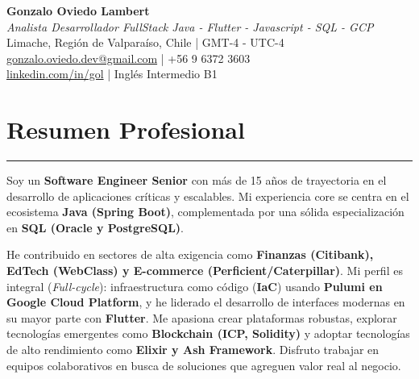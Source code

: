 \documentclass[11pt,a4paper]{article}
\begin{document}
\begin{center}
    {\LARGE \textbf{Gonzalo Oviedo Lambert}} \\
    \vspace{2pt}
    \textit{Analista Desarrollador FullStack Java - Flutter - Javascript - SQL - GCP} \\
    \vspace{2pt}
    Limache, Región de Valparaíso, Chile | GMT-4 - UTC-4 \\
    \vspace{2pt}
    \href{gonzalo.oviedo.dev@gmail.com}{gonzalo.oviedo.dev@gmail.com} | +56 9 6372 3603 \\
    \href{https://www.linkedin.com/in/gol}{linkedin.com/in/gol} | Inglés Intermedio B1
\end{center}


\section*{Resumen Profesional}
\hrule
\vspace{5pt}
\noindent
Soy un \textbf{Software Engineer Senior} con más de 15 años de trayectoria en el desarrollo de aplicaciones críticas y escalables. Mi experiencia core se centra en el ecosistema \textbf{Java (Spring Boot)}, complementada por una sólida especialización en \textbf{SQL (Oracle y PostgreSQL)}.

He contribuido en sectores de alta exigencia como \textbf{Finanzas (Citibank), EdTech (WebClass) y E-commerce (Perficient/Caterpillar)}. Mi perfil es integral (\textit{Full-cycle}): infraestructura como código (\textbf{IaC}) usando \textbf{Pulumi en Google Cloud Platform}, y he liderado el desarrollo de interfaces modernas en su mayor parte con \textbf{Flutter}. Me apasiona crear plataformas robustas, explorar tecnologías emergentes como \textbf{Blockchain (ICP, Solidity)} y adoptar tecnologías de alto rendimiento como \textbf{Elixir y Ash Framework}. Disfruto trabajar en equipos colaborativos en busca de soluciones que agreguen valor real al negocio.

\end{document}
